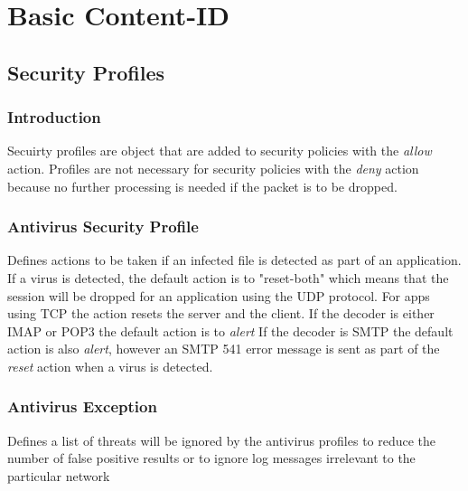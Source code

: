 \section{Basic Content-ID}
\subsection{Security Profiles}
\subsubsection{Introduction}
Secuirty profiles are object that are added to security policies with the \textit{allow} action. Profiles are not necessary for security policies with the \textit{deny} action because no further processing is needed if the packet is to be dropped. 

\subsubsection{Antivirus Security Profile}
Defines actions to be taken if an infected file is detected as part of an application. If a virus is detected, the default action is to "reset-both" which means that the session will be dropped for an application using the UDP protocol. For apps using TCP the action resets the server and the client.
If the decoder is either IMAP or POP3 the default action is to \textit{alert}
If the decoder is SMTP the default action is also \textit{alert}, however an SMTP 541 error message is sent as part of the \textit{reset} action when a virus is detected.


\subsubsection{Antivirus Exception}
Defines a list of threats will be ignored by the antivirus profiles to reduce the number of false positive results or to ignore log messages irrelevant to the particular network 

